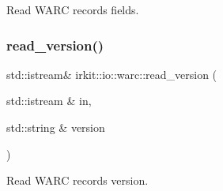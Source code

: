 Read W\+A\+RC record\textquotesingle{}s fields. 

\mbox{\label{namespaceirkit_1_1io_1_1warc_a09893fe6fcb5dc9474474aa904c510d2}} 
\subsubsection{\texorpdfstring{read\+\_\+version()}{read\_version()}}
{\footnotesize\ttfamily std\+::istream\& irkit\+::io\+::warc\+::read\+\_\+version (\begin{DoxyParamCaption}\item[{std\+::istream \&}]{in,  }\item[{std\+::string \&}]{version }\end{DoxyParamCaption})\hspace{0.3cm}{\ttfamily [inline]}}



Read W\+A\+RC record\textquotesingle{}s version. 

